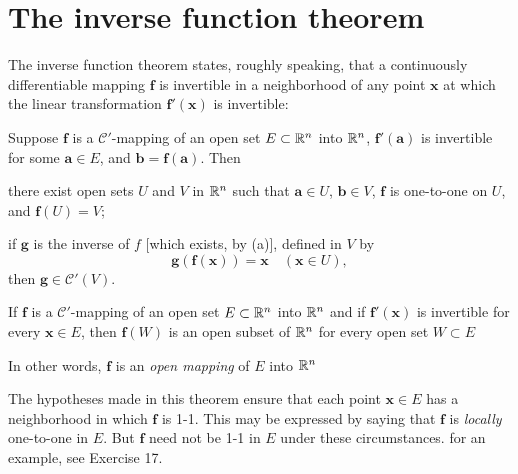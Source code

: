 \section{The inverse function theorem}

The inverse function theorem states, roughly speaking, that a continuously
differentiable mapping $\mathbf{f}$ is invertible in a neighborhood of any point $\mathbf{x}$ at which
the linear transformation $\mathbf{f'(x)}$ is invertible:

\begin{thm}
    \label{thm:9.24}
    Suppose $\mathbf{f}$ is a $\mathscr{C}'$-mapping of an open set $E \subset {\protect\mathbb R}^n$ into ${\protect\mathbb R}^n$, 
    $\mathbf{f'(a)}$ is invertible for some $\mathbf{a} \in E$, 
    and $\mathbf{b = f(a)}$. Then
    \begin{asparaenum}[(a)]
        \item there exist open sets $U$ and $V$ in ${\protect\mathbb R}^n$ 
        such that $\mathbf{a} \in U$, $\mathbf{b} \in V$, 
        $\mathbf{f}$ is one-to-one on $U$, and $\mathbf{f}(U) = V$;
        \item if $\mathbf{g}$ is the inverse of $f$ [which exists, by (a)], defined in $V$ by
        \begin{equation*}
            \mathbf{g(f(x)) = x}
            \quad
            (\mathbf{x} \in U),
        \end{equation*}
        then $\mathbf{g} \in \mathscr{C}'(V)$.
    \end{asparaenum}
\end{thm}



\begin{thm}
    \label{thm:9.25}
    If $\mathbf{f}$ is a $\mathscr{C}'$-mapping of an open set $E \subset {\protect\mathbb R}^n$ into ${\protect\mathbb R}^n$ 
    and if $\mathbf{f'(x)}$ is invertible for every $\mathbf{x} \in E$, 
    then $\mathbf{f}(W)$ is an open subset of ${\protect\mathbb R}^n$ for every open set
    $W \subset E$
\end{thm}

In other words, $\mathbf{f}$ is an \emph{open mapping} of $E$ into ${\protect\mathbb R}^n$

The hypotheses made in this theorem ensure that each point $\mathbf{x} \in E$ has a
neighborhood in which $\mathbf{f}$ is 1-1. 
This may be expressed by saying that $\mathbf{f}$ is
\emph{locally} one-to-one in $E$. 
But $\mathbf{f}$ need not be 1-1 in $E$ under these circumstances.
for an example, see Exercise 17.